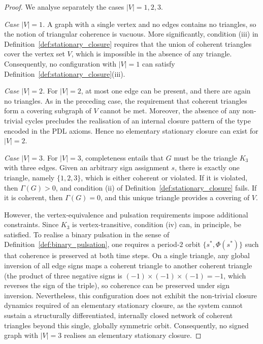 \documentclass[11pt,a4paper]{article}
\theoremstyle{definition}
\begin{document}
\begin{proof}
We analyse separately the cases $|V|=1,2,3$.

\medskip
\noindent\emph{Case $|V|=1$.} A graph with a single vertex and no edges contains no triangles, so the notion of triangular coherence is vacuous. More significantly, condition (iii) in Definition~\ref{def:stationary_closure} requires that the union of coherent triangles cover the vertex set $V$, which is impossible in the absence of any triangle. Consequently, no configuration with $|V|=1$ can satisfy Definition~\ref{def:stationary_closure}(iii).\cite{PDL_Main_2026}

\medskip
\noindent\emph{Case $|V|=2$.} For $|V|=2$, at most one edge can be present, and there are again no triangles. As in the preceding case, the requirement that coherent triangles form a covering subgraph of $V$ cannot be met. Moreover, the absence of any non-trivial cycles precludes the realisation of an internal closure pattern of the type encoded in the PDL axioms.\cite{PDL_Intro_2026,Harary1953} Hence no elementary stationary closure can exist for $|V|=2$.

\medskip
\noindent\emph{Case $|V|=3$.} For $|V|=3$, completeness entails that $G$ must be the triangle $K_3$ with three edges. Given an arbitrary sign assignment $s$, there is exactly one triangle, namely $\{1,2,3\}$, which is either coherent or violated. If it is violated, then $\Gamma(G)>0$, and condition (ii) of Definition~\ref{def:stationary_closure} fails. If it is coherent, then $\Gamma(G)=0$, and this unique triangle provides a covering of $V$.

However, the vertex-equivalence and pulsation requirements impose additional constraints. Since $K_3$ is vertex-transitive, condition (iv) can, in principle, be satisfied. To realise a binary pulsation in the sense of Definition~\ref{def:binary_pulsation}, one requires a period-$2$ orbit $\{s^\ast,\Phi(s^\ast)\}$ such that coherence is preserved at both time steps. On a single triangle, any global inversion of all edge signs maps a coherent triangle to another coherent triangle (the product of three negative signs is $(-1)\times(-1)\times(-1)=-1$, which reverses the sign of the triple), so coherence can be preserved under sign inversion.\cite{CartwrightHarary1956,PDL_Main_2026} Nevertheless, this configuration does not exhibit the non-trivial closure dynamics required of an elementary stationary closure, as the system cannot sustain a structurally differentiated, internally closed network of coherent triangles beyond this single, globally symmetric orbit. Consequently, no signed graph with $|V|=3$ realises an elementary stationary closure.
\end{proof}
\end{document}
